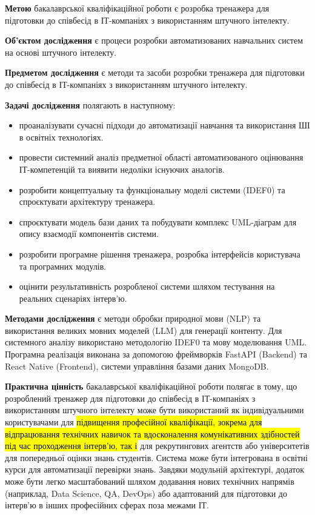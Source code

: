 \documentclass[
]{article}
\begin{document}
\textbf{Метою} бакалаврської кваліфікаційної роботи є розробка тренажера
для підготовки до співбесід в ІТ-компаніях з використанням штучного
інтелекту.

\textbf{Об'єктом дослідження} є процеси розробки автоматизованих
навчальних систем на основі штучного інтелекту.

\textbf{Предметом дослідження} є методи та засоби розробки тренажера для
підготовки до співбесід в ІТ-компаніях з використанням штучного
інтелекту.

\textbf{Задачі дослідження} полягають в наступному:

\begin{itemize}
\item
  проаналізувати сучасні підходи до автоматизації навчання та
  використання ШІ в освітніх технологіях.
\item
  провести системний аналіз предметної області автоматизованого
  оцінювання ІТ-компетенцій та виявити недоліки існуючих аналогів.
\item
  розробити концептуальну та функціональну моделі системи (IDEF0) та
  спроєктувати архітектуру тренажера.
\item
  спроєктувати модель бази даних та побудувати комплекс UML-діаграм для
  опису взаємодії компонентів системи.
\item
  розробити програмне рішення тренажера, розробка інтерфейсів
  користувача та програмних модулів.
\item
  оцінити результативність розробленої системи шляхом тестування на
  реальних сценаріях інтерв'ю.
\end{itemize}

\textbf{Методами дослідження} є методи обробки природної мови (NLP) та
використання великих мовних моделей (LLM) для генерації контенту. Для
системного аналізу використано методологію IDEF0 та мову моделювання
UML. Програмна реалізація виконана за допомогою фреймворків FastAPI
(Backend) та React Native (Frontend), системи управління базами даних
MongoDB.

\textbf{Практична цінність} бакалаврської кваліфікаційної роботи полягає
в тому, що розроблений тренажер для підготовки до співбесід в
ІТ-компаніях з використанням штучного інтелекту може бути використаний
як індивідуальними користувачами для \hl{підвищення професійної
кваліфікації, зокрема для відпрацювання технічних навичок та
вдосконалення комунікативних здібностей під час проходження інтерв'ю,
так і} для рекрутингових агентств або університетів для попередньої
оцінки знань студентів. Система може бути інтегрована в освітні курси
для автоматизації перевірки знань. Завдяки модульній архітектурі,
додаток може бути легко масштабований шляхом додавання нових технічних
напрямів (наприклад, Data Science, QA, DevOps) або адаптований для
підготовки до інтерв'ю в інших професійних сферах поза межами ІТ.
\end{document}
